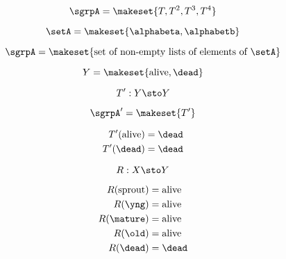 {\begin{forslides}
        \begin{equation}
            \sgrpA = \makeset{T, T^2, T^3, T^4 }
        \end{equation}

        \begin{equation}
            \setA = \makeset{ \alphabeta, \alphabetb }
        \end{equation}

        \begin{equation}
            \sgrpA = \makeset{ \text{set of non-empty lists of elements of }\setA}
        \end{equation}

        \begin{equation}
            Y = \makeset{ \text{alive}, \dead }
        \end{equation}

        \begin{equation}
            T' : Y \sto Y
        \end{equation}

        \begin{equation}
            \sgrpA' = \makeset{T' }
        \end{equation}

        \begin{equation}
            \begin{aligned}
                T'(\text{alive}) & =  \dead \\
                T' (\dead)       & = \dead
            \end{aligned}
        \end{equation}

        \begin{equation}
            R: X \sto Y
        \end{equation}

        \begin{equation}
            \begin{aligned}
                R(\text{sprout}) & = \text{alive} \\
                R(\yng)          & =  \text{alive} \\
                R(\mature)       & = \text{alive} \\
                R( \old)         & = \text{alive} \\
                R (\dead)        & = \dead
            \end{aligned}
        \end{equation}


\end{forslides}}
